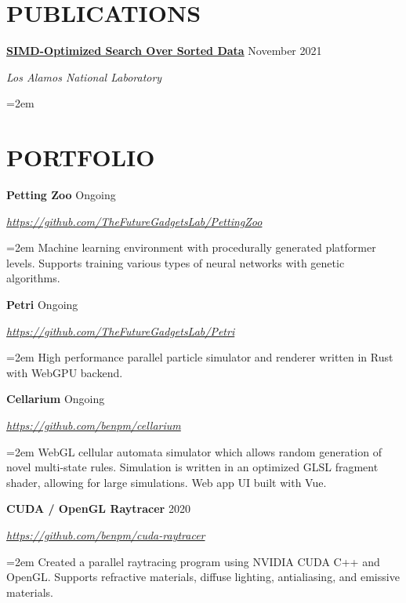 \documentclass[paper=a4,fontsize=11pt]{scrartcl} %
\newcommand{\sepspace}{\vspace*{1em}}		%
\newcommand{\sym}{\raisebox{1pt}{$\blacktriangleright$}}
\newcommand{\showurl}[1]{\href{#1}{#1}}
\newcommand{\NewPart}[1]{\section*{\sym \mbox{} \MakeUppercase{#1}}}
\newcommand{\EducationEntry}[5]{
		\Large \noindent \textbf{#1} \hfill \\   %
		\normalsize \noindent \textit{#2} \hfill	  %
		\colorbox{yel}{\color{blk}#3} \par  %
		\noindent \textit{#4} \par        %
		\noindent\hangindent=2em\hangafter=0 \small #5 %
		\normalsize \par
		\sepspace}
\newcommand{\WorkEntry}[4]{				  %
		\noindent \textbf{#1} \hfill      %
		\colorbox{yel}{\color{blk}#2} \par  %
		\noindent \textit{#3} \par              %
		\noindent\hangindent=2em\hangafter=0 \small #4 %
		\normalsize \par
		\sepspace}
\begin{document}



\NewPart{Publications}{}

\WorkEntry{\href{https://asmedigitalcollection.asme.org/computingengineering/article-abstract/22/2/021009/1121736/simd-Optimized-Search-Over-Sorted-Data}{SIMD-Optimized Search Over Sorted Data}}
{November 2021}{Los Alamos National Laboratory}



\pagebreak

\NewPart{Portfolio}{}

\WorkEntry{Petting Zoo}{Ongoing}{\showurl{https://github.com/TheFutureGadgetsLab/PettingZoo}}{
	Machine learning environment with procedurally generated platformer levels.
	Supports training various types of neural networks with genetic algorithms.
}

\WorkEntry{Petri}{Ongoing}{\showurl{https://github.com/TheFutureGadgetsLab/Petri}}{
	High performance parallel particle simulator and renderer written in Rust with WebGPU backend.
}

\WorkEntry{Cellarium}{Ongoing}{\showurl{https://github.com/benpm/cellarium}}{
	WebGL cellular automata simulator which allows random generation of novel multi-state rules.
	Simulation is written in an optimized GLSL fragment shader, allowing for large simulations.
	Web app UI built with Vue.
}

\WorkEntry{CUDA / OpenGL Raytracer}{2020}{\showurl{https://github.com/benpm/cuda-raytracer}}{
	Created a parallel raytracing program using NVIDIA CUDA C++ and OpenGL.
	Supports refractive materials, diffuse lighting, antialiasing, and emissive materials.
}
\end{document}
